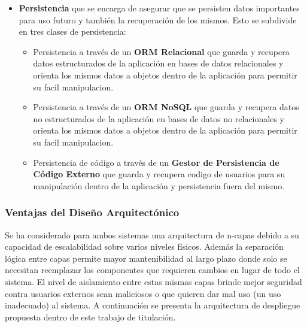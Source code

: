 \begin{itemize}
\begin{itemize}
    \end{itemize}
	\item \textbf{Persistencia} que se encarga de asegurar que se persisten datos importantes para uso futuro y también la recuperación de los mismos. Esto se subdivide en tres clases de persistencia:
    \begin{itemize}
    	\item Persistencia a través de un \textbf{ORM Relacional} que guarda y recupera datos estructurados de la aplicación en bases de datos relacionales y orienta los mismos datos a objetos dentro de la aplicación para permitir su facil manipulacion.
		\item Persistencia a través de un \textbf{ORM NoSQL} que guarda y recupera datos no estructurados de la aplicación en bases de datos no relacionales y orienta los mismos datos a objetos dentro de la aplicación para permitir su facil manipulacion.
		\item Persistencia de código a través de un \textbf{Gestor de Persistencia de Código Externo} que guarda y recupera codigo de usuarios para su manipulación dentro de la aplicación y persistencia fuera del mismo.
    \end{itemize}
\end{itemize}


\subsubsection{Ventajas del Diseño Arquitectónico}
Se ha considerado para ambos sistemas una arquitectura de n-capas debido a su capacidad de escalabilidad sobre varios niveles físicos. Además la separación lógica entre capas permite mayor mantenibilidad al largo plazo donde solo se necesitan reemplazar los componentes que requieren cambios en lugar de todo el sistema. El nivel de aislamiento entre estas mismas capas brinde mejor seguridad contra usuarios externos sean maliciosos o que quieren dar mal uso (un uso inadecuado) al sistema. A continuación se presenta la arquitectura de despliegue propuesta dentro de este trabajo de titulación.

